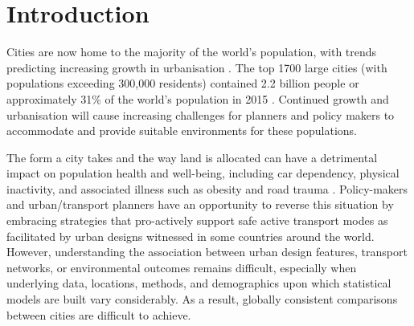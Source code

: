 \documentclass[urbansci,article,submit,moreauthors,pdftex]{Definitions/mdpi}
\begin{document}


\section{Introduction}\label{sec:introduction}
Cities are now home to the majority of the world's population, with trends predicting increasing growth in urbanisation \citep{UNDESA2015,WHO2016,ABS2008}. The top 1700 large cities (with populations exceeding 300,000 residents) contained 2.2 billion people or approximately 31\% of the world's population in 2015 \citep{UN2014}. Continued growth and urbanisation will cause increasing challenges for planners and policy makers to accommodate and provide suitable environments for these populations.

The form a city takes and the way land is allocated can have a detrimental impact on population health and well-being, including car dependency, physical inactivity, and associated illness such as obesity and road trauma \citep{Giles-corti2016,Kleinert2016,Goenka2016,Zapata-Diomedi2017,Heesch2014,Daley2011, Cepeda2016,MingWen2008,Norman2006,Thompson2018b}. Policy-makers and urban/transport planners have an opportunity to reverse this situation by embracing strategies that pro-actively support safe active transport modes as facilitated by urban designs witnessed in some countries around the world. However, understanding the association between urban design features, transport networks, or environmental outcomes remains difficult, especially when underlying data, locations, methods, and demographics upon which statistical models are built vary considerably. As a result, globally consistent comparisons between cities are difficult to achieve. 
\end{document}

